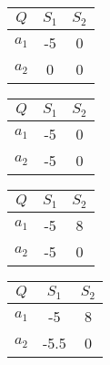 \begin{enumerate}
\begin{table}[h]
\small       
\begin{tabular}[t]{|c c c|}
\hline
$Q$ & $S_{1}$ & $S_{2}$  \\ \hline
$a_{1}$&-5&0\\ \hline
$a_{2}$& 0 & 0\\ \hline
\end{tabular}
\hfill
\begin{tabular}[t]{|c c c|}
\hline
$Q$ & $S_{1}$ & $S_{2}$  \\ \hline
$a_{1}$&-5&0\\ \hline
$a_{2}$&-5&0\\ \hline
\end{tabular}
\hfill
\begin{tabular}[t]{|c c c|}
 \hline
 $Q$ & $S_{1}$ & $S_{2}$  \\ \hline
 $a_{1}$&-5&8\\ \hline
 $a_{2}$&-5&0 \\ \hline
 \end{tabular}
 \hfill
 \begin{tabular}[t]{|c c c|}
 \hline
 $Q$ & $S_{1}$ & $S_{2}$  \\ \hline
 $a_{1}$&-5&8\\ \hline
 $a_{2}$&-5.5&0 \\ \hline
\end{tabular}
\end{table}

 

\end{enumerate}